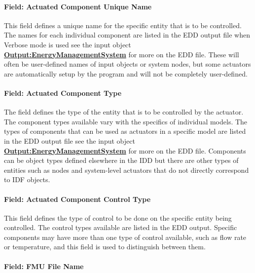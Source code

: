\paragraph{Field: Actuated Component Unique Name}\label{field-actuated-component-unique-name-1}

This field defines a unique name for the specific entity that is to be controlled. The names for each individual component are listed in the EDD output file when Verbose mode is used see the input object \textbf{\hyperref[outputenergymanagementsystem]{Output:EnergyManagementSystem}} for more on the EDD file. These will often be user-defined names of input objects or system nodes, but some actuators are automatically setup by the program and will not be completely user-defined.

\paragraph{Field: Actuated Component Type}\label{field-actuated-component-type-1}

The field defines the type of the entity that is to be controlled by the actuator. The component types available vary with the specifics of individual models. The types of components that can be used as actuators in a specific model are listed in the EDD output file see the input object \textbf{\hyperref[outputenergymanagementsystem]{Output:EnergyManagementSystem}} for more on the EDD file. Components can be object types defined elsewhere in the IDD but there are other types of entities such as nodes and system-level actuators that do not directly correspond to IDF objects.

\paragraph{Field: Actuated Component Control Type}\label{field-actuated-component-control-type-1}

This field defines the type of control to be done on the specific entity being controlled. The control types available are listed in the EDD output. Specific components may have more than one type of control available, such as flow rate or temperature, and this field is used to distinguish between them.

\paragraph{Field: FMU File Name}\label{field-fmu-file-name-3}

